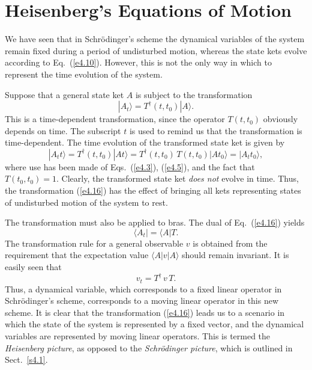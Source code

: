 \section{Heisenberg's Equations of Motion}\label{s4.2}
We have seen that in Schr\"{o}dinger's scheme the dynamical variables of the
system remain fixed during a period of undisturbed motion, whereas the state kets
evolve according to Eq.~(\ref{e4.10}). However, this is not the only way in which
to represent the time evolution of the system. 

Suppose that a general state ket $A$ is subject to the transformation 
\begin{equation}\label{e4.16}
|A_t \rangle = T^{\dag}(t, t_0) |A\rangle.
\end{equation}
This is a time-dependent transformation,  since  the operator $T(t, t_0)$ obviously
depends on time. The subscript $t$ is used to remind us that the transformation
is time-dependent. 
 The time evolution of the transformed state ket is given by
\begin{equation}
|A_t t\rangle = T^{\dag} (t, t_0)|At\rangle = T^{\dag} (t, t_0)\,T (t, t_0)
|At_0\rangle = |A_t t_0\rangle,
\end{equation}
where use has been made of Eqs.~(\ref{e4.3}), (\ref{e4.5}), and the fact that $T(t_0, t_0)=1$. 
Clearly, the transformed state ket {\em does not} evolve in time. Thus, the
transformation (\ref{e4.16}) has the effect of bringing all kets representing
states of undisturbed motion of the system to rest. 

The transformation  must also be applied to bras. The dual of Eq.~(\ref{e4.16})
yields
\begin{equation}
\langle A_t| =\langle A| T.
\end{equation}
The transformation rule for a general observable $v$ is obtained from the requirement
that the expectation value $\langle A|v|A\rangle$ 
should remain invariant. It is easily
seen that
\begin{equation}\label{e4.19}
v_t = T^{\dag} \,v \,T.
\end{equation}
Thus, a dynamical variable, which corresponds to a fixed linear operator in
Schr\"{o}\-dinger's scheme, corresponds to a moving linear operator in this
new scheme. It is clear that the transformation (\ref{e4.16}) leads us to a scenario
in which the state  of the system is represented by
a
 fixed vector, and the dynamical variables
are represented by moving linear operators. This is termed the {\em Heisenberg
picture}, as opposed to the {\em Schr\"{o}dinger picture},
which is  outlined in Sect.~\ref{s4.1}.

